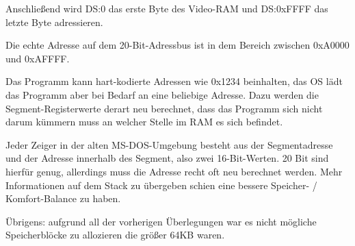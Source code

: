 Anschließend wird DS:0 das erste Byte des Video-RAM und DS:0xFFFF das letzte
Byte adressieren.

Die echte Adresse auf dem 20-Bit-Adressbus ist in dem Bereich zwischen 0xA0000
und 0xAFFFF.

Das Programm kann hart-kodierte Adressen wie 0x1234 beinhalten, das \ac{OS} lädt
das Programm aber bei Bedarf an eine beliebige Adresse. Dazu werden die Segment-Registerwerte
derart neu berechnet, dass das Programm sich nicht darum kümmern muss an welcher
Stelle im RAM es sich befindet.

Jeder Zeiger in der alten MS-DOS-Umgebung besteht aus der Segmentadresse und der
Adresse innerhalb des Segment, also zwei 16-Bit-Werten. 20 Bit sind hierfür genug,
allerdings muss die Adresse recht oft neu berechnet werden. Mehr Informationen auf
dem Stack zu übergeben schien eine bessere Speicher- / Komfort-Balance zu haben.

Übrigens: aufgrund all der vorherigen Überlegungen war es nicht mögliche Speicherblöcke
zu allozieren die größer 64KB waren.


%
%
%
%
%
